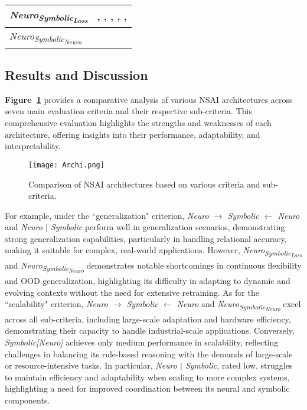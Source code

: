 \documentclass[12pt]{article}
\begin{document}
\begin{table}[h]
\begin{tabular}{|l|p{10cm}|}
        \hline
        \textit{Neuro\textsubscript{Symbolic\textsubscript{Loss}}} & \cite{serafini2016logic}, \cite{raissi2019physics}, \cite{chen2020mapping}, \cite{graziani2019jointly}, \cite{altszyler2020zero}, \cite{hussain2018semi} \\
        \hline
        \textit{Neuro\textsubscript{Symbolic\textsubscript{Neuro}}} & \cite{smolensky2016basicreasoningtensorproduct} \cite{smolensky1990tensor} \\
        \hline
    \end{tabular}
    \label{tab:references}
\end{table}


\subsection{Results and Discussion}
\noindent \textbf{Figure~\ref{comparison}}  provides a comparative analysis of various NSAI architectures across seven main evaluation criteria and their respective sub-criteria. This comprehensive evaluation highlights the strengths and weaknesses of each architecture, offering insights into their performance, adaptability, and interpretability.



\begin{figure}
    \centering
    \texttt{[image: Archi.png]}
    \caption{Comparison of NSAI architectures based on various criteria and sub-criteria.}
    \label{comparison}
\end{figure}

For example, under the ``generalization" criterion, \textit{Neuro $\to$ Symbolic $\leftarrow$ Neuro} and \textit{Neuro $|$ Symbolic} perform well in generalization scenarios, demonstrating strong generalization capabilities, particularly in handling relational accuracy, making it suitable for complex, real-world applications. However, \textit{Neuro\textsubscript{Symbolic\textsubscript{Loss}}} and \textit{Neuro\textsubscript{Symbolic\textsubscript{Neuro}}} demonstrates notable shortcomings in continuous flexibility and OOD generalization, highlighting its difficulty in adapting to dynamic and evolving contexts without the need for extensive retraining. As for the ``scalability" criterion, \textit{Neuro $\to$ Symbolic $\leftarrow$ Neuro} and \textit{Neuro\textsubscript{Symbolic\textsubscript{Neuro}}} excel across all sub-criteria, including large-scale adaptation and hardware efficiency, demonstrating their capacity to handle industrial-scale applications. Conversely, \textit{Symbolic[Neuro]} achieves only medium performance in scalability, reflecting challenges in balancing its rule-based reasoning with the demands of large-scale or resource-intensive tasks. In particular, \textit{Neuro $|$ Symbolic}, rated low, struggles to maintain efficiency and adaptability when scaling to more complex systems, highlighting a need for improved coordination between its neural and symbolic components. 
\end{document}
